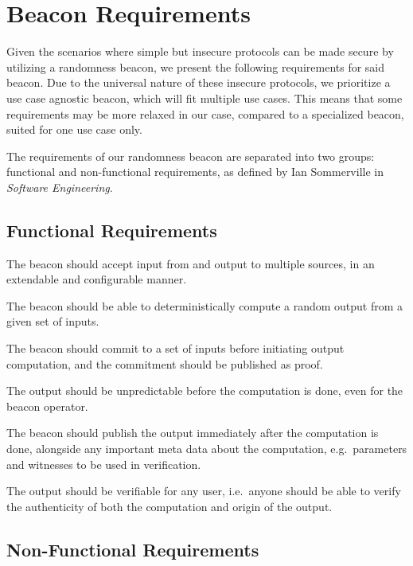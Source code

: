 \section{Beacon Requirements}
\label{sec:beacon_requirements}

Given the scenarios where simple but insecure protocols can be made secure by utilizing a randomness beacon, we present the following requirements for said beacon.
Due to the universal nature of these insecure protocols, we prioritize a use case agnostic beacon, which will fit multiple use cases.
This means that some requirements may be more relaxed in our case, compared to a specialized beacon, suited for one use case only.

The requirements of our randomness beacon are separated into two groups: functional and non-functional requirements, as defined by Ian Sommerville in \textit{Software Engineering}.

\subsection{Functional Requirements}
\label{sub:functional_requirements}
\begin{enumberate}
\item The beacon should accept input from and output to multiple sources, in an extendable and configurable manner.
\item The beacon should be able to deterministically compute a random output from a given set of inputs.
\item The beacon should commit to a set of inputs before initiating output computation, and the commitment should be published as proof.
\item The output should be unpredictable before the computation is done, even for the beacon operator.
\item The beacon should publish the output immediately after the computation is done, alongside any important meta data about the computation, e.g.\ parameters and witnesses to be used in verification.
\item The output should be verifiable for any user, i.e.\ anyone should be able to verify the authenticity of both the computation and origin of the output.
\end{enumberate}


\subsection{Non-Functional Requirements}
\label{sub:non_functional_requirements}

